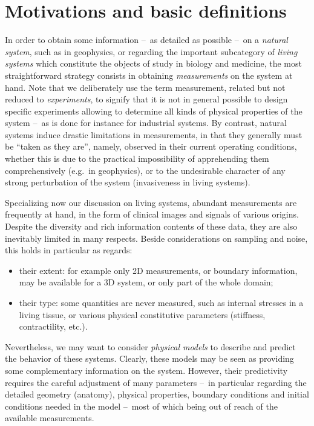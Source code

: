 \section{Motivations and basic definitions}

In order to obtain some information --~as detailed as possible --~on a \emph{natural system}, such as in geophysics, or regarding the important subcategory of \emph{living systems} which constitute the objects of study in biology and medicine, the most straightforward strategy consists in obtaining \emph{measurements} on the system at hand. Note that we deliberately use the term measurement, related but not reduced to \emph{experiments}, to signify that it is not in general possible to design specific experiments allowing to determine all kinds of physical properties of the system --~as is done for instance for industrial systems. By contrast, natural systems induce drastic limitations in measurements, in that they generally must be ``taken as they are'', namely, observed in their current operating conditions, whether this is due to the practical impossibility of apprehending them comprehensively (e.g.~in geophysics), or to the undesirable character of any strong perturbation of the system (invasiveness in living systems).

Specializing now our discussion on living systems, abundant measurements are frequently at hand, in the form of clinical images and signals of various origins. Despite the diversity and rich information contents of these data, they are also inevitably limited in many respects. Beside considerations on sampling and noise, this holds in particular as regards:
\begin{itemize}
	\item their extent: for example only 2D measurements, or boundary information, may be available for a 3D system, or only part of the whole domain;
	\item their type: some quantities are never measured, such as internal stresses in a living tissue, or various physical constitutive parameters (stiffness, contractility, etc.).
\end{itemize}

Nevertheless, we may want to consider \emph{physical models} to describe and predict the behavior of these systems. Clearly, these models may be seen as providing some complementary information on the system. However, their predictivity requires the careful adjustment of many parameters --~in particular regarding the detailed geometry (anatomy), physical properties, boundary conditions and initial conditions needed in the model --~most of which being out of reach of the available measurements.

